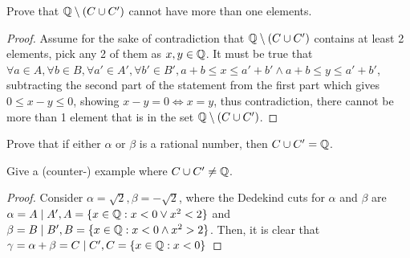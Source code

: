 \documentclass{homework}
\newcommand{\Q}{\bb{Q}} %
\newcommand{\?}{\stackrel{?}{=}}
\theoremstyle{definition}
\begin{document}
\question[2] Prove that $\Q\setminus(C\cup C')$ cannot have more than one elements. 
\begin{proof}
    Assume for the sake of contradiction that $\Q\setminus(C\cup C')$ contains at least 2 elements, pick any 2 of them as $x,y\in\Q$. It must be true that $\forall a\in A, \forall b\in B, \forall a'\in A',\forall b'\in B', a+b\leq x\leq a'+b'\land a+b\leq y\leq a'+b'$, subtracting the second part of the statement from the first part which gives $0\leq x-y\leq 0$, showing $x-y=0\iff x=y$, thus contradiction, there cannot be more than 1 element that is in the set $\Q\setminus(C\cup C')$. 
\end{proof}

\question[3] Prove that if either $\alpha$ or $\beta$ is a rational number, then $C\cup C'=\Q$. 

\question[4] Give a (counter-) example where $C\cup C'\neq \Q$. 

\begin{proof}
    Consider $\alpha=\sqrt2,\beta=-\sqrt2$, where the Dedekind cuts for $\alpha$ and $\beta$ are $\alpha=A\mid A', A=\{x\in\Q: x<0\lor x^2<2\}$ and $\beta= B\mid B', B=\{x\in\Q:x<0\land x^2>2\}$. Then, it is clear that $\gamma=\alpha+\beta=C\mid C', C=\{x\in\Q:x<0\}$
\end{proof}
\end{document}
